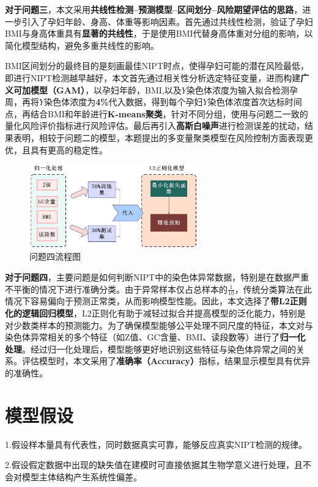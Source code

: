 \documentclass[12pt]{ctexart}
\begin{document}
	\textbf{对于问题三}，本文采用\textbf{共线性检测--预测模型--区间划分--风险期望评估的思路}，进一步引入了孕妇年龄、身高、体重等影响因素。首先通过共线性检测，验证了孕妇BMI与身高体重具有\textbf{显著的共线性}，于是使用BMI代替身高体重对分组的影响，以简化模型结构，避免多重共线性的影响。
	
	BMI区间划分的最终目的是刻画最佳NIPT时点，使得孕妇可能的潜在风险最低，即进行NIPT检测越早越好，本文首先通过相关性分析选定特征变量，进而构建\textbf{广义可加模型（GAM）}，以孕妇年龄，BMI,以及$Y$染色体浓度为输入拟合检测孕周，再将$Y$染色体浓度为\textbf{4\%}代入数据，得到每个孕妇$Y$染色体浓度首次达标时间点，再结合BMI和年龄进行\textbf{K-means聚类}，针对不同分组，使用与问题二一致的量化风险评价指标进行风险评估。最后再引入\textbf{高斯白噪声}进行检测误差的扰动，结果表明，相较于问题二的模型，本题提出的多变量聚类模型在风险控制方面表现更优，且具有更高的稳定性。
		
		\begin{figure}[H]
		\centering
		\includegraphics[width=0.65\textwidth]{Q4lc.png} %
		\caption{问题四流程图}
	\end{figure}
	
	\textbf{对于问题四}，主要问题是如何判断NIPT中的染色体异常数据，特别是在数据严重不平衡的情况下进行准确分类。由于异常样本仅占总样本的\textbf{$\frac{1}{10}$}，传统分类算法在此情况下容易偏向于预测正常类，从而影响模型性能。因此，本文选择了\textbf{带L2正则化的逻辑回归模型}，L2正则化有助于减轻过拟合并提高模型的泛化能力，特别是对少数类样本的预测能力。为了确保模型能够公平处理不同尺度的特征，本文对与染色体异常相关的多个特征（如Z值、GC含量、BMI、读段数等）进行了\textbf{归一化处理}。经过归一化处理后，模型能够更好地识别这些特征与染色体异常之间的关系。评估模型时，本文采用了\textbf{准确率（Accuracy）}指标，结果显示模型具有优异的准确性。
		
	
	\section{模型假设}
	1.假设样本量具有代表性，同时数据真实可靠，能够反应真实NIPT检测的规律。
	
	2.假设假定数据中出现的缺失值在建模时可直接依据其生物学意义进行处理，且不会对模型主体结构产生系统性偏差。
	
\end{document}
